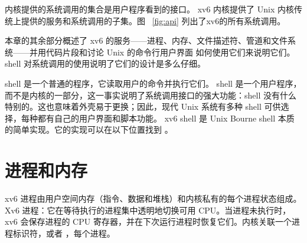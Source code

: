\documentclass[UTF8]{article}
\begin{document}
内核提供的系统调用的集合是用户程序看到的接口。 xv6 内核提供了 Unix 内核传统上提供的服务和系统调用的子集。图~   \ref{fig:api}   列出了xv6的所有系统调用。  

本章的其余部分概述了 xv6 的服务——进程、内存、文件描述符、管道和文件系统——并用代码片段和讨论 Unix 的命令行用户界面        如何使用它们来说明它们。 shell 对系统调用的使用说明了它们的设计是多么仔细。  

shell 是一个普通的程序，它读取用户的命令并执行它们。 shell 是一个用户程序，而不是内核的一部分，这一事实说明了系统调用接口的强大功能：shell 没有什么特别的。这也意味着外壳易于更换；因此，现代 Unix 系统有多种 shell 可供选择，每种都有自己的用户界面和脚本功能。 xv6 shell 是 Unix Bourne shell 本质的简单实现。它的实现可以在以下位置找到
        。
    \section{进程和内存  }     

xv6 进程由用户空间内存（指令、数据和堆栈）和内核私有的每个进程状态组成。 Xv6
        进程：它在等待执行的进程集中透明地切换可用 CPU。当进程未执行时，xv6 会保存进程的 CPU 寄存器，并在下次运行进程时恢复它们。内核关联一个进程标识符，或者
        ，每个进程。  
\end{document}
